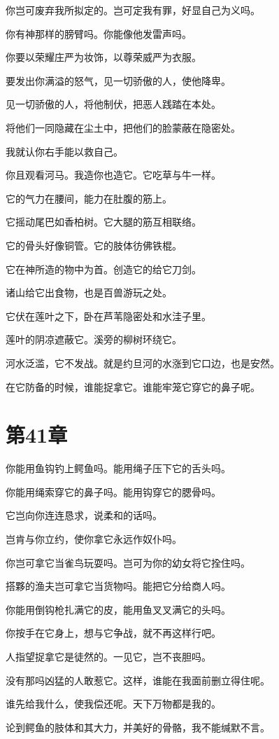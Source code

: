 \documentclass[12pt,oneside]{book}
\begin{document}
你岂可废弃我所拟定的。岂可定我有罪，好显自己为义吗。

你有神那样的膀臂吗。你能像他发雷声吗。

你要以荣耀庄严为妆饰，以尊荣威严为衣服。

要发出你满溢的怒气，见一切骄傲的人，使他降卑。

见一切骄傲的人，将他制伏，把恶人践踏在本处。

将他们一同隐藏在尘土中，把他们的脸蒙蔽在隐密处。

我就认你右手能以救自己。

你且观看河马。我造你也造它。它吃草与牛一样。

它的气力在腰间，能力在肚腹的筋上。

它摇动尾巴如香柏树。它大腿的筋互相联络。

它的骨头好像铜管。它的肢体彷佛铁棍。

它在神所造的物中为首。创造它的给它刀剑。

诸山给它出食物，也是百兽游玩之处。

它伏在莲叶之下，卧在芦苇隐密处和水洼子里。

莲叶的阴凉遮蔽它。溪旁的柳树环绕它。

河水泛滥，它不发战。就是约旦河的水涨到它口边，也是安然。

在它防备的时候，谁能捉拿它。谁能牢笼它穿它的鼻子呢。


\chapter{第41章}
你能用鱼钩钓上鳄鱼吗。能用绳子压下它的舌头吗。

你能用绳索穿它的鼻子吗。能用钩穿它的腮骨吗。

它岂向你连连恳求，说柔和的话吗。

岂肯与你立约，使你拿它永远作奴仆吗。

你岂可拿它当雀鸟玩耍吗。岂可为你的幼女将它拴住吗。

搭夥的渔夫岂可拿它当货物吗。能把它分给商人吗。

你能用倒钩枪扎满它的皮，能用鱼叉叉满它的头吗。

你按手在它身上，想与它争战，就不再这样行吧。

人指望捉拿它是徒然的。一见它，岂不丧胆吗。

没有那吗凶猛的人敢惹它。这样，谁能在我面前删立得住呢。

谁先给我什么，使我偿还呢。天下万物都是我的。

论到鳄鱼的肢体和其大力，并美好的骨骼，我不能缄默不言。
\end{document}
